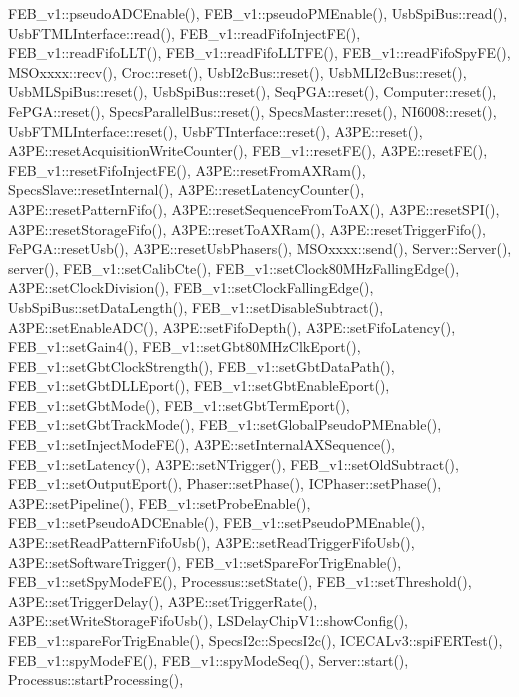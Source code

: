 F\+E\+B\+\_\+v1\+::pseudo\+A\+D\+C\+Enable(), F\+E\+B\+\_\+v1\+::pseudo\+P\+M\+Enable(), Usb\+Spi\+Bus\+::read(), Usb\+F\+T\+M\+L\+Interface\+::read(), F\+E\+B\+\_\+v1\+::read\+Fifo\+Inject\+F\+E(), F\+E\+B\+\_\+v1\+::read\+Fifo\+L\+L\+T(), F\+E\+B\+\_\+v1\+::read\+Fifo\+L\+L\+T\+F\+E(), F\+E\+B\+\_\+v1\+::read\+Fifo\+Spy\+F\+E(), M\+S\+Oxxxx\+::recv(), Croc\+::reset(), Usb\+I2c\+Bus\+::reset(), Usb\+M\+L\+I2c\+Bus\+::reset(), Usb\+M\+L\+Spi\+Bus\+::reset(), Usb\+Spi\+Bus\+::reset(), Seq\+P\+G\+A\+::reset(), Computer\+::reset(), Fe\+P\+G\+A\+::reset(), Specs\+Parallel\+Bus\+::reset(), Specs\+Master\+::reset(), N\+I6008\+::reset(), Usb\+F\+T\+M\+L\+Interface\+::reset(), Usb\+F\+T\+Interface\+::reset(), A3\+P\+E\+::reset(), A3\+P\+E\+::reset\+Acquisition\+Write\+Counter(), F\+E\+B\+\_\+v1\+::reset\+F\+E(), A3\+P\+E\+::reset\+F\+E(), F\+E\+B\+\_\+v1\+::reset\+Fifo\+Inject\+F\+E(), A3\+P\+E\+::reset\+From\+A\+X\+Ram(), Specs\+Slave\+::reset\+Internal(), A3\+P\+E\+::reset\+Latency\+Counter(), A3\+P\+E\+::reset\+Pattern\+Fifo(), A3\+P\+E\+::reset\+Sequence\+From\+To\+A\+X(), A3\+P\+E\+::reset\+S\+P\+I(), A3\+P\+E\+::reset\+Storage\+Fifo(), A3\+P\+E\+::reset\+To\+A\+X\+Ram(), A3\+P\+E\+::reset\+Trigger\+Fifo(), Fe\+P\+G\+A\+::reset\+Usb(), A3\+P\+E\+::reset\+Usb\+Phasers(), M\+S\+Oxxxx\+::send(), Server\+::\+Server(), server(), F\+E\+B\+\_\+v1\+::set\+Calib\+Cte(), F\+E\+B\+\_\+v1\+::set\+Clock80\+M\+Hz\+Falling\+Edge(), A3\+P\+E\+::set\+Clock\+Division(), F\+E\+B\+\_\+v1\+::set\+Clock\+Falling\+Edge(), Usb\+Spi\+Bus\+::set\+Data\+Length(), F\+E\+B\+\_\+v1\+::set\+Disable\+Subtract(), A3\+P\+E\+::set\+Enable\+A\+D\+C(), A3\+P\+E\+::set\+Fifo\+Depth(), A3\+P\+E\+::set\+Fifo\+Latency(), F\+E\+B\+\_\+v1\+::set\+Gain4(), F\+E\+B\+\_\+v1\+::set\+Gbt80\+M\+Hz\+Clk\+Eport(), F\+E\+B\+\_\+v1\+::set\+Gbt\+Clock\+Strength(), F\+E\+B\+\_\+v1\+::set\+Gbt\+Data\+Path(), F\+E\+B\+\_\+v1\+::set\+Gbt\+D\+L\+L\+Eport(), F\+E\+B\+\_\+v1\+::set\+Gbt\+Enable\+Eport(), F\+E\+B\+\_\+v1\+::set\+Gbt\+Mode(), F\+E\+B\+\_\+v1\+::set\+Gbt\+Term\+Eport(), F\+E\+B\+\_\+v1\+::set\+Gbt\+Track\+Mode(), F\+E\+B\+\_\+v1\+::set\+Global\+Pseudo\+P\+M\+Enable(), F\+E\+B\+\_\+v1\+::set\+Inject\+Mode\+F\+E(), A3\+P\+E\+::set\+Internal\+A\+X\+Sequence(), F\+E\+B\+\_\+v1\+::set\+Latency(), A3\+P\+E\+::set\+N\+Trigger(), F\+E\+B\+\_\+v1\+::set\+Old\+Subtract(), F\+E\+B\+\_\+v1\+::set\+Output\+Eport(), Phaser\+::set\+Phase(), I\+C\+Phaser\+::set\+Phase(), A3\+P\+E\+::set\+Pipeline(), F\+E\+B\+\_\+v1\+::set\+Probe\+Enable(), F\+E\+B\+\_\+v1\+::set\+Pseudo\+A\+D\+C\+Enable(), F\+E\+B\+\_\+v1\+::set\+Pseudo\+P\+M\+Enable(), A3\+P\+E\+::set\+Read\+Pattern\+Fifo\+Usb(), A3\+P\+E\+::set\+Read\+Trigger\+Fifo\+Usb(), A3\+P\+E\+::set\+Software\+Trigger(), F\+E\+B\+\_\+v1\+::set\+Spare\+For\+Trig\+Enable(), F\+E\+B\+\_\+v1\+::set\+Spy\+Mode\+F\+E(), Processus\+::set\+State(), F\+E\+B\+\_\+v1\+::set\+Threshold(), A3\+P\+E\+::set\+Trigger\+Delay(), A3\+P\+E\+::set\+Trigger\+Rate(), A3\+P\+E\+::set\+Write\+Storage\+Fifo\+Usb(), L\+S\+Delay\+Chip\+V1\+::show\+Config(), F\+E\+B\+\_\+v1\+::spare\+For\+Trig\+Enable(), Specs\+I2c\+::\+Specs\+I2c(), I\+C\+E\+C\+A\+Lv3\+::spi\+F\+E\+R\+Test(), F\+E\+B\+\_\+v1\+::spy\+Mode\+F\+E(), F\+E\+B\+\_\+v1\+::spy\+Mode\+Seq(), Server\+::start(), Processus\+::start\+Processing(), 